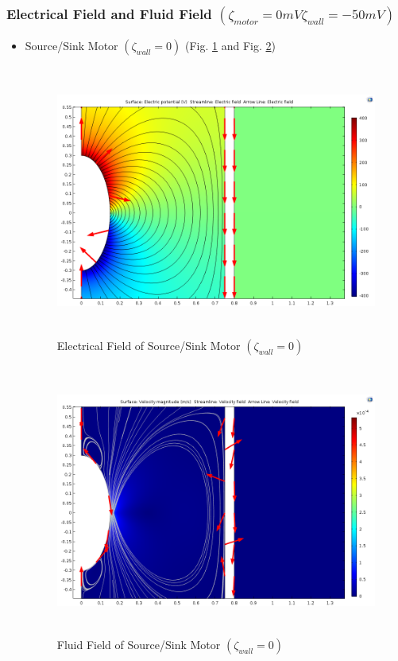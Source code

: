 \documentclass[fontsize=11pt, %
                             paper=a4, %
                             twoside, %
                             captions=tableheading,
                             index=totoc,
                             hyperref]{labbook}
\begin{document}
\begin{addmargin}[4cm]{0cm}
\subsubsection*{Electrical Field and Fluid Field $(\zeta_{motor}=0 mV \zeta_{wall}=-50 mV)$}
\begin{itemize}
\item Source/Sink Motor $(\zeta_{wall}=0)$ (Fig. \ref{2016-11-13-EFOSSMW0} and Fig. \ref{2016-11-13-FFOSSMW0})
\begin{figure}
\centering
\includegraphics[width=\linewidth, height=3.5in]{2016-11-13-SourceSink-E-Motor.png}
\caption{Electrical Field of Source/Sink Motor $(\zeta_{wall}=0)$}\label{2016-11-13-EFOSSMW0}
\end{figure}
\begin{figure}
\centering
\includegraphics[width=\linewidth, height=3.5in]{2016-11-13-SourceSink-V-Motor.png}
\caption{Fluid Field of Source/Sink Motor $(\zeta_{wall}=0)$}\label{2016-11-13-FFOSSMW0}

\end{figure}
\end{itemize}
\end{addmargin}
\end{document}
